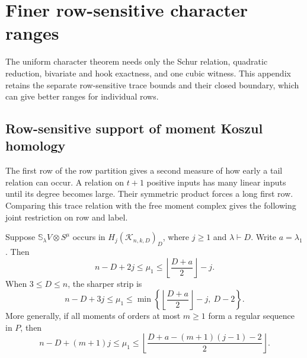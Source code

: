 \section{Finer row-sensitive character ranges}
\label{app:finer-character-bounds}

The uniform character theorem needs only the Schur relation, quadratic
reduction, bivariate and hook exactness, and one cubic witness. This
appendix retains the separate row-sensitive trace bounds and their
closed boundary, which can give better ranges for individual rows.

\subsection{Row-sensitive support of moment Koszul homology}

The first row of the row partition gives a second measure of how
early a tail relation can occur.  A relation on $t+1$ positive
inputs has many linear inputs until its degree becomes large.
Their symmetric product forces a long first row.  Comparing this
trace relation with the free moment complex gives the following
joint restriction on row and label.

\begin{theorem}
\label{thm:row-sensitive-moment-homology-strip}
Suppose $\mathbb S_\lambda V\otimes S^\mu$ occurs in
$H_j(\mathcal K_{n,k,D})_D$, where $j\ge1$ and
$\lambda\vdash D$.  Write $a=\lambda_1$.  Then
\begin{equation}\label{eq:row-sensitive-moment-homology-strip}
 n-D+2j\le\mu_1\le
       \left\lfloor\frac{D+a}{2}\right\rfloor-j.
\end{equation}
When $3\le D\le n$, the sharper strip is
\begin{equation}\label{eq:row-sensitive-quadratic-moment-strip}
 n-D+3j\le\mu_1\le
 \min\left\{\left\lfloor\frac{D+a}{2}\right\rfloor-j,\ D-2\right\}.
\end{equation}
More generally, if all moments of orders at most $m\ge1$ form a
regular sequence in $P$, then
\begin{equation}\label{eq:row-sensitive-regular-moment-strip}
 n-D+(m+1)j\le\mu_1\le
 \left\lfloor\frac{D+a-(m+1)(j-1)-2}{2}\right\rfloor.
\end{equation}
\end{theorem}


